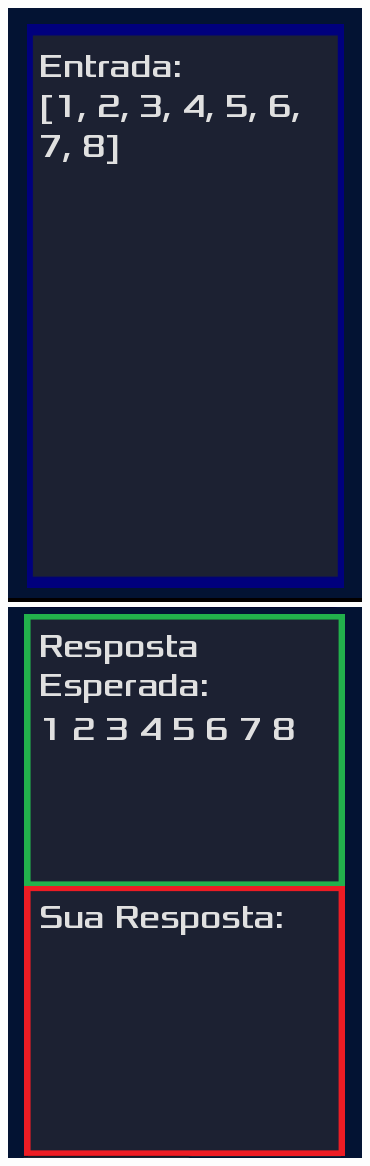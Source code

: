 \begin{figure}[H]
    \centering
    \begin{minipage}{.4\textwidth}
      \centering
      \includegraphics[scale=0.3]{../figuras/exemplo_entrada.png}
    \end{minipage}%
    \begin{minipage}{.4\textwidth}
      \centering
      \includegraphics[scale=0.3]{../figuras/exemplo_saida.png}

\end{minipage}
\end{figure}
